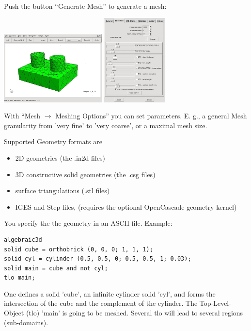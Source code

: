 \documentclass[20pt,landscape,footrule]{foils}
\begin{document}
\foilhead{\color{blue}
{\bf Generating the Mesh } \\}
%
Push the button ``Generate Mesh'' to generate a mesh:
\begin{center}
\includegraphics[width=0.4\textwidth]{netgen-mesh.jpg} 
\hspace{0.1\textwidth}
\includegraphics[width=0.25\textwidth]{meshingoptions.jpg} 
\end{center}
With ``Mesh $\rightarrow$ Meshing Options'' you can set parameters. E. g., a general Mesh granularity from 'very fine' to 'very coarse', or a maximal mesh size.

\foilhead{\color{blue}
{\bf Define the geometry} \\}
Supported Geometry formats are
\begin{itemize}
\item 2D geometries (the .in2d files)
\item 3D constructive solid geometries (the .csg files)
\item surface triangulations (.stl files)
\item IGES and Step files, (requires the optional OpenCascade geometry kernel)
\end{itemize}

\foilhead{\color{blue}
{\bf The 3D CSG - Files} \\ }
You specify the the geometry in an ASCII file. Example:

\begin{verbatim}
algebraic3d
solid cube = orthobrick (0, 0, 0; 1, 1, 1);
solid cyl = cylinder (0.5, 0.5, 0; 0.5, 0.5, 1; 0.03);
solid main = cube and not cyl;
tlo main;
\end{verbatim}
One defines a solid 'cube', an infinite cylinder solid 'cyl', and forms the intersection of the cube and the complement of the cylinder. The Top-Level-Object (tlo) 'main' is going to be meshed. Several tlo will lead to several regions (sub-domains). 
\end{document}
